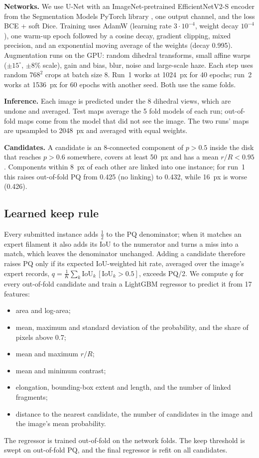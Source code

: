\documentclass[sigconf]{acmart}
\begin{document}
\textbf{Networks.} We use U-Net \cite{ronneberger2015unet} with an ImageNet-pretrained Efficient\-NetV2-S encoder \cite{tan2021efficientnetv2} from the Segmentation Models PyTorch library \cite{iakubovskii2019smp}, one output channel, and the loss BCE + soft Dice. Training uses AdamW (learning rate $3\cdot10^{-4}$, weight decay $10^{-4}$), one warm-up epoch followed by a cosine decay, gradient clipping, mixed precision, and an exponential moving average of the weights (decay 0.995). Augmentation runs on the GPU: random dihedral transforms, small affine warps ($\pm15^\circ$, $\pm8\%$ scale), gain and bias, blur, noise and large-scale haze. Each step uses random $768^2$ crops at batch size 8. Run~1 works at 1024~px for 40 epochs; run~2 works at 1536~px for 60 epochs with another seed. Both use the same folds.

\textbf{Inference.} Each image is predicted under the 8 dihedral views, which are undone and averaged. Test maps average the 5 fold models of each run; out-of-fold maps come from the model that did not see the image. The two runs' maps are upsampled to 2048~px and averaged with equal weights.

\textbf{Candidates.} A candidate is an 8-connected component of $p>0.5$ inside the disk that reaches $p>0.6$ somewhere, covers at least 50~px and has a mean $r/R<0.95$. Components within 8~px of each other are linked into one instance; for run~1 this raises out-of-fold PQ from 0.425 (no linking) to 0.432, while 16~px is worse (0.426).

\subsection{Learned keep rule}\label{sec:keep}
Every submitted instance adds $\tfrac12$ to the PQ denominator; when it matches an expert filament it also adds its IoU to the numerator and turns a miss into a match, which leaves the denominator unchanged. Adding a candidate therefore raises PQ only if its expected IoU-weighted hit rate, averaged over the image's expert records, $q=\frac1{K}\sum_k \mathrm{IoU}_k\,[\mathrm{IoU}_k>0.5]$, exceeds PQ/2. We compute $q$ for every out-of-fold candidate and train a LightGBM regressor \cite{ke2017lightgbm} to predict it from 17 features:
\begin{itemize}
    \item area and log-area;
    \item mean, maximum and standard deviation of the probability, and the share of pixels above 0.7;
    \item mean and maximum $r/R$;
    \item mean and minimum contrast;
    \item elongation, bounding-box extent and length, and the number of linked fragments;
    \item distance to the nearest candidate, the number of candidates in the image and the image's mean probability.
\end{itemize}
The regressor is trained out-of-fold on the network folds. The keep threshold is swept on out-of-fold PQ, and the final regressor is refit on all candidates.
\end{document}
